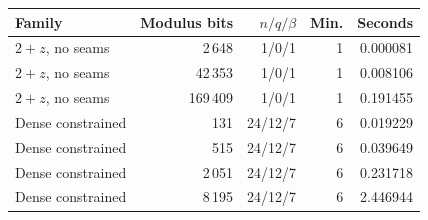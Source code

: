 \begin{center}
\small
\begin{tabular}{lrrrr}
\toprule
Family & Modulus bits & $n/q/\beta$ & Min. & Seconds\\
\midrule
$2+z$, no seams & 2\,648 & 1/0/1 & 1 & 0.000081\\
$2+z$, no seams & 42\,353 & 1/0/1 & 1 & 0.008106\\
$2+z$, no seams & 169\,409 & 1/0/1 & 1 & 0.191455\\
Dense constrained & 131 & 24/12/7 & 6 & 0.019229\\
Dense constrained & 515 & 24/12/7 & 6 & 0.039649\\
Dense constrained & 2\,051 & 24/12/7 & 6 & 0.231718\\
Dense constrained & 8\,195 & 24/12/7 & 6 & 2.446944\\
\bottomrule
\end{tabular}
\end{center}

